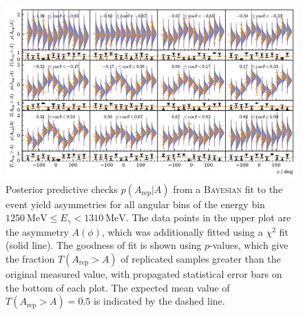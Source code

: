 \begin{figure}
		\centering
		\includegraphics[width=\linewidth]{../bayes/realdeal/plots/ppd_checks.pdf}
		\caption{Posterior predictive checks $p\left(A_\text{rep}\big|A\right)$ from a \textsc{Bayesian} fit to the event yield asymmetries for all angular bins of the energy bin $\SI{1250}{\mega\eV}\leq E_\gamma<\SI{1310}{\mega\eV}$. The data points in the upper plot are the asymmetry $A\left(\phi\right)$, which was additionally fitted using a $\chi^2$ fit (solid line). The goodness of fit is shown using $p$-values, which give the fraction $T\left(A_\text{rep}>A\right)$ of replicated samples greater than the original measured value, with propagated statistical error bars on the bottom of each plot. The expected mean value of $T\left(A_\text{rep}>A\right)=0.5$ is indicated by the dashed line. }
		\label{fig:asym}
\end{figure}



